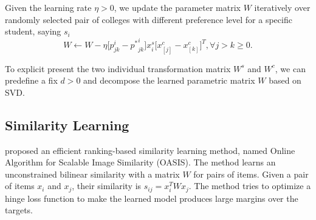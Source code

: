 \documentclass[12pt]{article}
\begin{document}
Given the learning rate $\eta>0$, we update the parameter matrix $W$ iteratively over randomly selected pair of colleges with different preference level for a specific student, saying $s_i$
\[
W\leftarrow W - \eta \big[p_{jk}^i - {p^*}_{jk}^i\big] x_i^s \big[x_{[j]}^c-x_{[k]}^c\big]^T, \forall j > k \ge 0.
\]

To explicit present the two individual transformation matrix $W^s$ and $W^c$, we can predefine a fix $d > 0$ and decompose the learned parametric matrix $W$ based on SVD.

\newpage
\subsection{Similarity Learning}
\cite{chechik2009online} proposed an efficient ranking-based similarity learning method, named Online Algorithm for Scalable Image Similarity (OASIS). The method learns an unconstrained bilinear similarity with a matrix $W$ for pairs of items. Given a pair of items $x_i$ and $x_j$, their similarity is $s_{ij} = x_i^T W x_j$. The method tries to optimize a hinge loss function to make the learned model produces large margins over the targets.
\end{document}
